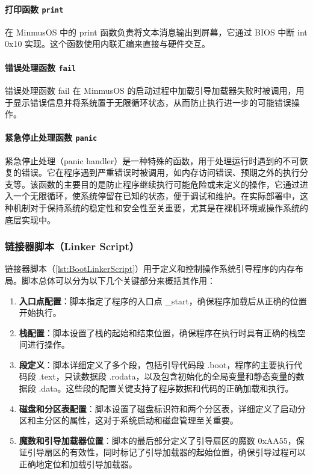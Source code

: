 \paragraph{打印函数 \texttt{print}}

在 MinmusOS 中的 print 函数负责将文本消息输出到屏幕，它通过 BIOS 中断 int 0x10 实现。这个函数使用内联汇编来直接与硬件交互。

\paragraph{错误处理函数 \texttt{fail}}

错误处理函数 fail 在 MinmusOS 的启动过程中加载引导加载器失败时被调用，用于显示错误信息并将系统置于无限循环状态，从而防止执行进一步的可能错误操作。

\paragraph{紧急停止处理函数 \texttt{panic}}

紧急停止处理（panic handler）是一种特殊的函数，用于处理运行时遇到的不可恢复的错误。它在程序遇到严重错误时被调用，如内存访问错误、预期之外的执行分支等。该函数的主要目的是防止程序继续执行可能危险或未定义的操作，它通过进入一个无限循环，使系统停留在已知的状态，便于调试和维护。在实际部署中，这种机制对于保持系统的稳定性和安全性至关重要，尤其是在裸机环境或操作系统的底层实现中。

\subsubsection{链接器脚本（Linker Script）}\label{LinkerScript}

链接器脚本（\cref{lst:BootLinkerScript}）用于定义和控制操作系统引导程序的内存布局。脚本总体可以分为以下几个关键部分来概括其作用：

\begin{enumerate}
    \item \textbf{入口点配置}：脚本指定了程序的入口点 \_start，确保程序加载后从正确的位置开始执行。
    \item \textbf{栈配置}：脚本设置了栈的起始和结束位置，确保程序在执行时具有正确的栈空间进行操作。
    \item \textbf{段定义}：脚本详细定义了多个段，包括引导代码段 .boot，程序的主要执行代码段 .text，只读数据段 .rodata，以及包含初始化的全局变量和静态变量的数据段 .data。这些段的配置关键支持了程序数据和代码的正确加载和执行。
    \item \textbf{磁盘和分区表配置}：脚本设置了磁盘标识符和两个分区表，详细定义了启动分区和主分区的属性，这对于系统启动和磁盘管理至关重要。
    \item \textbf{魔数和引导加载器位置}：脚本的最后部分定义了引导扇区的魔数 0xAA55，保证引导扇区的有效性，同时标记了引导加载器的起始位置，确保引导过程可以正确地定位和加载引导加载器。
\end{enumerate}

